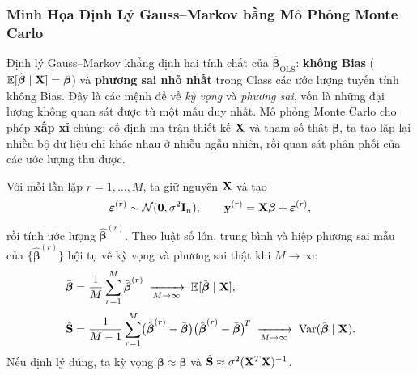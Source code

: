 \subsubsection{Minh Họa Định Lý Gauss--Markov bằng Mô Phỏng Monte Carlo}


Định lý Gauss--Markov khẳng định hai tính chất của $\hat{\boldsymbol{\beta}}_{\mathrm{OLS}}$:
\textbf{không Bias} ($\mathbb{E}[\hat{\boldsymbol{\beta}}\mid\mathbf{X}] = \boldsymbol{\beta}$) và
\textbf{phương sai nhỏ nhất} trong Class các ước lượng tuyến tính không Bias. Đây là các
mệnh đề về \textit{kỳ vọng} và \textit{phương sai}, vốn là những đại lượng không quan sát được
từ một mẫu duy nhất. Mô phỏng Monte Carlo cho phép \textbf{xấp xỉ} chúng: cố định ma trận
thiết kế $\mathbf{X}$ và tham số thật $\boldsymbol{\beta}$, ta tạo lặp lại nhiều bộ dữ liệu
chỉ khác nhau ở nhiễu ngẫu nhiên, rồi quan sát phân phối của các ước lượng thu được.


Với mỗi lần lặp $r = 1, \ldots, M$, ta giữ nguyên $\mathbf{X}$ và tạo
\[
    \boldsymbol{\varepsilon}^{(r)} \sim \mathcal{N}(\mathbf{0}, \sigma^2\mathbf{I}_n),
    \qquad
    \mathbf{y}^{(r)} = \mathbf{X}\boldsymbol{\beta} + \boldsymbol{\varepsilon}^{(r)},
\]
rồi tính ước lượng $\hat{\boldsymbol{\beta}}^{(r)}$. Theo luật số lớn, trung bình và hiệp
phương sai mẫu của $\{\hat{\boldsymbol{\beta}}^{(r)}\}$ hội tụ về kỳ vọng và phương sai
thật khi $M \to \infty$:
\begin{align}
    \bar{\boldsymbol{\beta}}
    &= \frac{1}{M}\sum_{r=1}^{M}\hat{\boldsymbol{\beta}}^{(r)}
    \;\xrightarrow[M\to\infty]{}\;
    \mathbb{E}[\hat{\boldsymbol{\beta}}\mid\mathbf{X}],
    \label{eq:mc_mean}\\[2pt]
    \hat{\mathbf{S}}
    &= \frac{1}{M-1}\sum_{r=1}^{M}
       \bigl(\hat{\boldsymbol{\beta}}^{(r)} - \bar{\boldsymbol{\beta}}\bigr)
       \bigl(\hat{\boldsymbol{\beta}}^{(r)} - \bar{\boldsymbol{\beta}}\bigr)^{\!T}
    \;\xrightarrow[M\to\infty]{}\;
    \mathrm{Var}(\hat{\boldsymbol{\beta}}\mid\mathbf{X}).
    \label{eq:mc_cov}
\end{align}
Nếu định lý đúng, ta kỳ vọng $\bar{\boldsymbol{\beta}} \approx \boldsymbol{\beta}$ và
$\hat{\mathbf{S}} \approx \sigma^2(\mathbf{X}^T\mathbf{X})^{-1}$.


